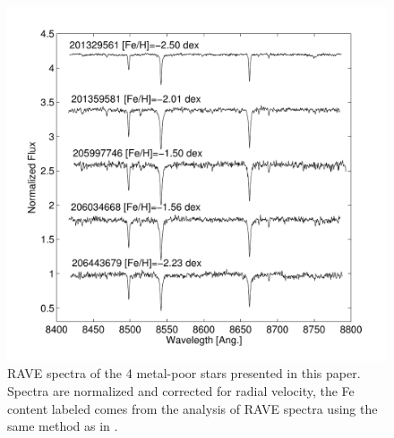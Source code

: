 \documentclass{aa}
\begin{document}
   \begin{figure}
   \centering
   \includegraphics[width=1\columnwidth]{./Figures/spectra.pdf}
   \caption{RAVE spectra of the 4 metal-poor stars presented in this paper. Spectra are normalized and corrected for radial velocity, the Fe content labeled comes from the analysis of RAVE spectra using the same method as in \cite{Valentini2017}.}
              \label{Fig:spectra}%
    \end{figure}
\end{document}
